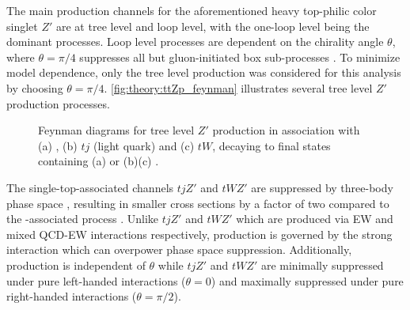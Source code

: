 \documentclass[../thesis.tex]{subfiles}
\begin{document}
The main production channels for the aforementioned heavy top-philic color singlet $Z'$ are at tree level and loop level, with the one-loop level being the dominant processes. Loop level processes are dependent on the chirality angle $\theta$, where $\theta=\pi/4$ suppresses all but gluon-initiated box sub-processes \citep{theory:ttZp}. To minimize model dependence, only the tree level production was considered for this analysis by choosing $\theta=\pi/4$. \autoref{fig:theory:ttZp_feynman} illustrates several tree level $Z'$ production processes.

\begin{figure}[!htbp]
\centering
{}
\caption[Feynman diagrams for tree level $Z'$ production in association with (a) \ttbar, (b) $tj$ (light quark) and (c) $tW$, decaying to final states containing (a) \tttt or (b)(c) \ttt.]{\label{fig:theory:ttZp_feynman}Feynman diagrams for tree level $Z'$ production in association with (a) \ttbar, (b) $tj$ (light quark) and (c) $tW$, decaying to final states containing (a) \tttt or (b)(c) \ttt \citep{theory:ttZp}.}
\end{figure}

The single-top-associated channels $tjZ'$ and $tWZ'$ are suppressed by three-body phase space \citep{theory:ttZp}, resulting in smaller cross sections by a factor of two compared to the \ttbar-associated process \ttZp. Unlike $tjZ'$ and $tWZ'$ which are produced via \acs{EW} and mixed \acs{QCD}-\acs{EW} interactions respectively, \tttt production is governed by the strong interaction which can overpower phase space suppression. Additionally, \tttt production is independent of $\theta$ while $tjZ'$ and $tWZ'$ are minimally suppressed under pure left-handed interactions ($\theta=0$) and maximally suppressed under pure right-handed interactions ($\theta=\pi/2$).
\end{document}
